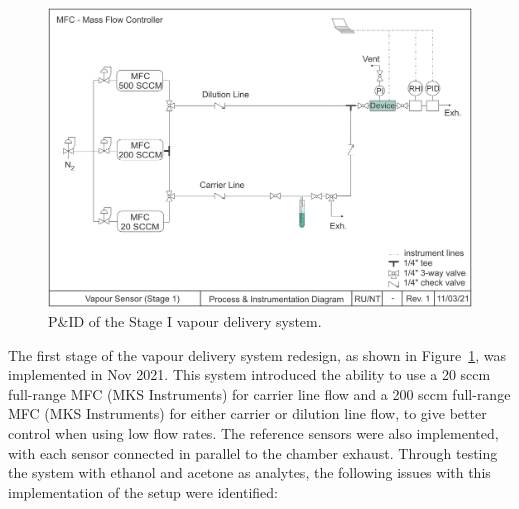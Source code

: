 \documentclass[
  a4paper,
]{scrbook}
\begin{document}
\begin{figure}

{\centering \includegraphics[width=1\textwidth,height=\textheight]{figures/ch5/PID_V1.png}

}

\caption{\label{fig-stage-1-pid}P\&ID of the Stage I vapour delivery
system.}

\end{figure}

The first stage of the vapour delivery system redesign, as shown in
Figure~\ref{fig-stage-1-pid}, was implemented in Nov 2021. This system
introduced the ability to use a 20 sccm full-range MFC (MKS Instruments)
for carrier line flow and a 200 sccm full-range MFC (MKS Instruments)
for either carrier or dilution line flow, to give better control when
using low flow rates. The reference sensors were also implemented, with
each sensor connected in parallel to the chamber exhaust. Through
testing the system with ethanol and acetone as analytes, the following
issues with this implementation of the setup were identified:
\end{document}
